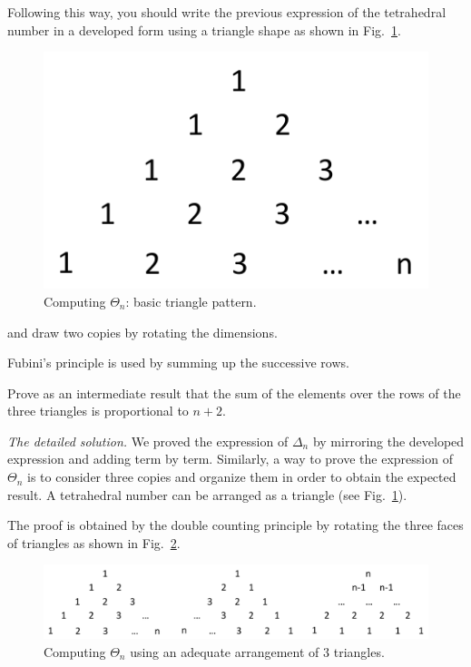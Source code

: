 Following this way, you should write the previous expression of the tetrahedral number in a developed form 
using a triangle shape as shown in Fig.~\ref{fig:TetrahedralBasic}.
\begin{figure}[h]
\begin{center}
        \includegraphics[scale=0.5]{FiguresArithmetic/TetrahedralBasic}
        \caption{Computing $\Theta_n$: basic triangle pattern.}
        \label{fig:TetrahedralBasic}
\end{center}
\end{figure}
and draw two copies by rotating the dimensions.

Fubini's principle is used by summing up the successive rows.

Prove as an intermediate result that the sum of the elements over the rows of the three triangles is proportional to $n+2$.
\medskip

\noindent \textit{The detailed solution.}
We proved the expression of $\Delta_n$ by mirroring the developed expression and adding term by term.
Similarly, a way to prove the expression of $\Theta_n$ is to consider three copies and organize them 
in order to obtain the expected result.
A tetrahedral number can be arranged as a triangle (see Fig.~\ref{fig:TetrahedralBasic}).

The proof is obtained by the double counting principle by rotating the three faces of triangles as shown in Fig.~\ref{fig:Tetrahedral}.
\begin{figure}[h]
\begin{center}
        \includegraphics[scale=0.5]{FiguresArithmetic/Tetrahedral}
        \caption{Computing $\Theta_n$ using an adequate arrangement of $3$ triangles.}
        \label{fig:Tetrahedral}
\end{center}
\end{figure}

